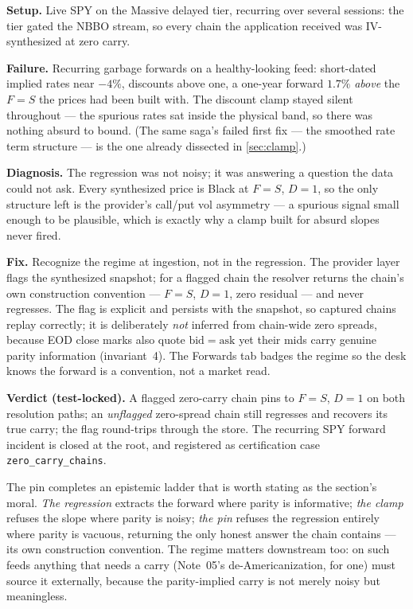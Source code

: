 \documentclass[11pt]{article}
\begin{document}
\begin{example}[title={Case file: the garbage forwards the clamp could not
see}]
\textbf{Setup.}  Live SPY on the Massive delayed tier, recurring over
several sessions: the tier gated the NBBO stream, so every chain the
application received was IV-synthesized at zero carry.

\textbf{Failure.}  Recurring garbage forwards on a healthy-looking feed:
short-dated implied rates near $-4\%$, discounts above one, a one-year
forward $1.7\%$ \emph{above} the $F=S$ the prices had been built with.
The discount clamp stayed silent throughout --- the spurious rates sat
inside the physical band, so there was nothing absurd to bound.  (The
same saga's failed first fix --- the smoothed rate term structure --- is
the one already dissected in \cref{sec:clamp}.)

\textbf{Diagnosis.}  The regression was not noisy; it was answering a
question the data could not ask.  Every synthesized price is Black at
$F=S$, $D=1$, so the only structure left is the provider's call/put vol
asymmetry --- a spurious signal small enough to be plausible, which is
exactly why a clamp built for absurd slopes never fired.

\textbf{Fix.}  Recognize the regime at ingestion, not in the regression.
The provider layer flags the synthesized snapshot; for a flagged chain
the resolver returns the chain's own construction convention --- $F=S$,
$D=1$, zero residual --- and never regresses.  The flag is explicit and
persists with the snapshot, so captured chains replay correctly; it is
deliberately \emph{not} inferred from chain-wide zero spreads, because
EOD close marks also quote $\mathrm{bid}=\mathrm{ask}$ yet their mids
carry genuine parity information (invariant~4).  The Forwards tab badges
the regime so the desk knows the forward is a convention, not a market
read.

\textbf{Verdict (test-locked).}  A flagged zero-carry chain pins to
$F=S$, $D=1$ on both resolution paths; an \emph{unflagged} zero-spread
chain still regresses and recovers its true carry; the flag round-trips
through the store.  The recurring SPY forward incident is closed at the
root, and registered as certification case \texttt{zero\_carry\_chains}.
\end{example}

The pin completes an epistemic ladder that is worth stating as the
section's moral.  \emph{The regression} extracts the forward where parity
is informative; \emph{the clamp} refuses the slope where parity is noisy;
\emph{the pin} refuses the regression entirely where parity is vacuous,
returning the only honest answer the chain contains --- its own
construction convention.  The regime matters downstream too: on such
feeds anything that needs a carry (Note~05's de-Americanization, for one)
must source it externally, because the parity-implied carry is not merely
noisy but meaningless.
\end{document}

